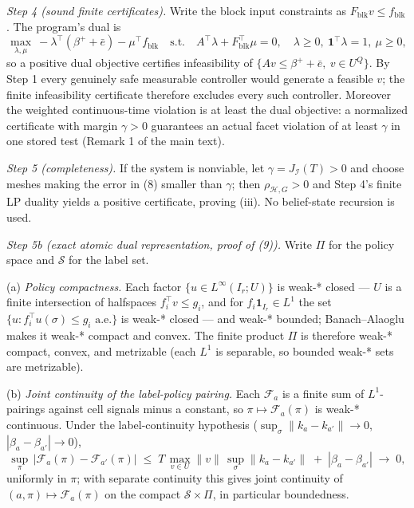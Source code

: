 \documentclass[10pt,article]{article}
\begin{document}
\emph{Step 4 (sound finite certificates).} Write the block input constraints
as \(F_{\mathrm{blk}} v \le f_{\mathrm{blk}}\). The program's dual is
\[
\max_{\lambda,\mu}\ -\lambda^\top(\beta^{+} + \bar e) - \mu^\top
f_{\mathrm{blk}}
\quad \text{s.t.} \quad
A^\top \lambda + F_{\mathrm{blk}}^\top \mu = 0,\quad
\lambda \ge 0,\ \mathbf 1^\top \lambda = 1,\ \mu \ge 0,
\tag{12}
\]
so a positive dual objective certifies infeasibility of \(\{A v \le
\beta^{+} + \bar e,\ v \in U^{Q}\}\). By Step 1 every genuinely safe
measurable controller would generate a feasible \(v\); the finite
infeasibility certificate therefore excludes every such controller. Moreover
the weighted continuous-time violation is at least the dual objective: a
normalized certificate with margin \(\gamma > 0\) guarantees an actual facet
violation of at least \(\gamma\) in one stored test (Remark 1 of the main
text).

\emph{Step 5 (completeness).} If the system is nonviable, let
\(\gamma = J_{\mathcal I}(T) > 0\) and choose meshes making the error in
(8) smaller than \(\gamma\); then \(\rho_{\mathcal H,G} > 0\) and Step 4's
finite LP duality yields a positive certificate, proving (iii). No
belief-state recursion is used.

\emph{Step 5b (exact atomic dual representation, proof of (9)).} Write
\(\Pi\) for the policy space and \(\mathscr S\) for the label set.

(a) \emph{Policy compactness.} Each factor
\(\{u \in L^\infty(I_r; U)\}\) is weak-* closed --- \(U\) is a finite
intersection of halfspaces \(f_i^\top v \le g_i\), and for
\(f_i \mathbf 1_{I_r} \in L^1\) the set \(\{u : f_i^\top u(\sigma)
\le g_i \text{ a.e.}\}\) is weak-* closed --- and weak-* bounded;
Banach--Alaoglu makes it weak-* compact and convex. The finite product
\(\Pi\) is therefore weak-* compact, convex, and metrizable (each
\(L^1\) is separable, so bounded weak-* sets are metrizable).

(b) \emph{Joint continuity of the label-policy pairing.} Each
\(\mathcal F_a\) is a finite sum of \(L^1\)-pairings against cell
signals minus a constant, so \(\pi \mapsto \mathcal F_a(\pi)\) is weak-*
continuous. Under the label-continuity hypothesis
(\(\sup_\sigma \|k_a - k_{a'}\| \to 0\), \(|\beta_a - \beta_{a'}| \to 0\)),
\[
\sup_\pi \, |\mathcal F_a(\pi) - \mathcal F_{a'}(\pi)|
\;\le\; T \, \max_{v \in U} \|v\| \, \sup_\sigma \|k_a - k_{a'}\|
\;+\; |\beta_a - \beta_{a'}| \;\to\; 0,
\]
uniformly in \(\pi\); with separate continuity this gives joint
continuity of \((a, \pi) \mapsto \mathcal F_a(\pi)\) on the compact
\(\mathscr S \times \Pi\), in particular boundedness.
\end{document}
